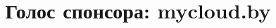 \documentclass[10pt, a5paper]{article}
\begin{document}
\title{Голос спонсора: mycloud.by}
\date{}
\maketitle

~
\end{document}
